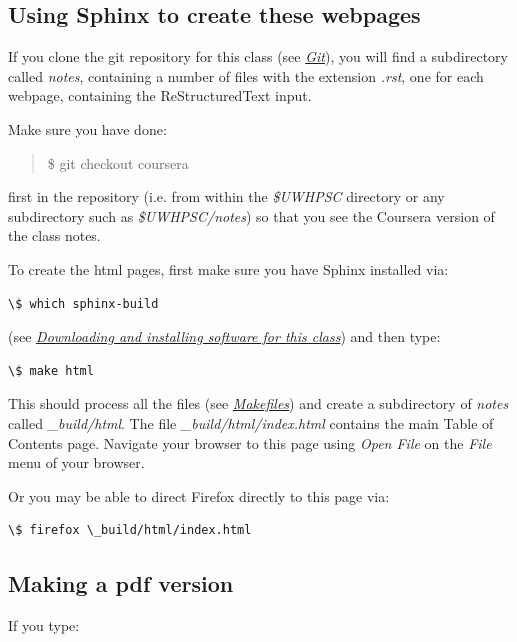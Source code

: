 \documentclass[letterpaper,10pt,english]{sphinxmanual}
\begin{document}
\subsection{Using Sphinx to create these webpages}
\label{sphinx:using-sphinx-to-create-these-webpages}
If you clone the git repository for this class (see {\hyperref[git:git]{\emph{Git}}}), you will find
a subdirectory called \emph{notes}, containing a number of files with the
extension \emph{.rst}, one for each webpage, containing the ReStructuredText
input.

Make sure you have done:
\begin{quote}

\$ git checkout coursera
\end{quote}

first in the repository (i.e. from within the \emph{\$UWHPSC} directory or any
subdirectory such as \emph{\$UWHPSC/notes})
so that you see the Coursera version of the class notes.

To create the html pages, first make sure you have Sphinx installed via:

\begin{Verbatim}[commandchars=\\\{\}]
\$ which sphinx-build
\end{Verbatim}

(see {\hyperref[software_installation:software-installation]{\emph{Downloading and installing software for this class}}}) and then type:

\begin{Verbatim}[commandchars=\\\{\}]
\$ make html
\end{Verbatim}

This should process all the files (see {\hyperref[makefiles:makefiles]{\emph{Makefiles}}}) and create a
subdirectory of \emph{notes} called \emph{\_build/html}.  The file
\emph{\_build/html/index.html} contains the main Table of Contents page.
Navigate your browser to this page using \emph{Open File} on the \emph{File} menu of
your browser.

Or you may be able to direct Firefox directly to this page via:

\begin{Verbatim}[commandchars=\\\{\}]
\$ firefox \_build/html/index.html
\end{Verbatim}


\subsection{Making a pdf version}
\label{sphinx:making-a-pdf-version}
If you type:
\end{document}
